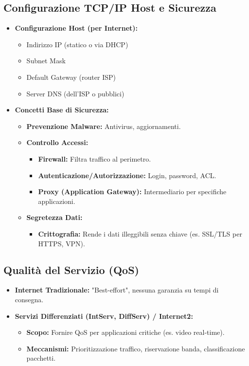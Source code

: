 \subsection{Configurazione TCP/IP Host e Sicurezza}
\begin{itemize}
    \item \textbf{Configurazione Host (per Internet):}
        \begin{itemize}
            \item Indirizzo IP (statico o via DHCP)
            \item Subnet Mask
            \item Default Gateway (router ISP)
            \item Server DNS (dell'ISP o pubblici)
        \end{itemize}
    \item \textbf{Concetti Base di Sicurezza:}
        \begin{itemize}
            \item \textbf{Prevenzione Malware:} Antivirus, aggiornamenti.
            \item \textbf{Controllo Accessi:}
                \begin{itemize}
                    \item \textbf{Firewall:} Filtra traffico al perimetro.
                    \item \textbf{Autenticazione/Autorizzazione:} Login, password, ACL.
                    \item \textbf{Proxy (Application Gateway):} Intermediario per specifiche applicazioni.
                \end{itemize}
            \item \textbf{Segretezza Dati:}
                \begin{itemize}
                    \item \textbf{Crittografia:} Rende i dati illeggibili senza chiave (es. SSL/TLS per HTTPS, VPN).
                \end{itemize}
        \end{itemize}
\end{itemize}

\subsection{Qualità del Servizio (QoS)}
\begin{itemize}
    \item \textbf{Internet Tradizionale:} "Best-effort", nessuna garanzia su tempi di consegna.
    \item \textbf{Servizi Differenziati (IntServ, DiffServ) / Internet2:}
        \begin{itemize}
            \item \textbf{Scopo:} Fornire QoS per applicazioni critiche (es. video real-time).
            \item \textbf{Meccanismi:} Prioritizzazione traffico, riservazione banda, classificazione pacchetti.
        \end{itemize}
\end{itemize}



